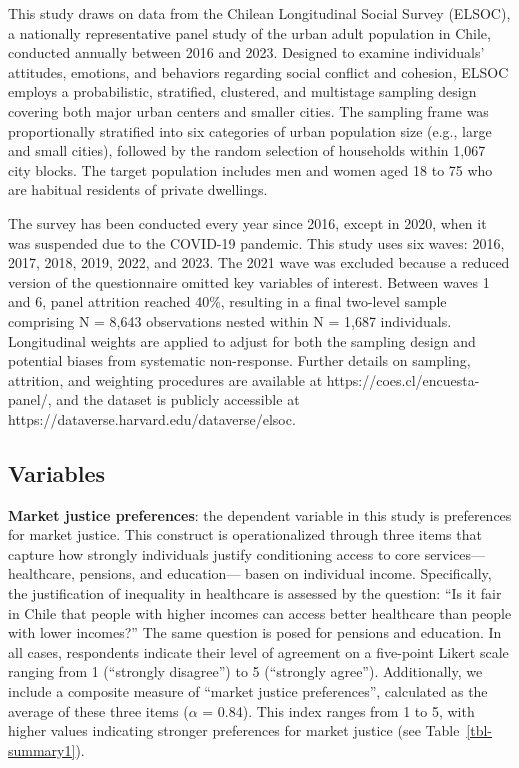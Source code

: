 \documentclass[
  12pt,
]{article}
\begin{document}
This study draws on data from the Chilean Longitudinal Social Survey
(ELSOC), a nationally representative panel study of the urban adult
population in Chile, conducted annually between 2016 and 2023. Designed
to examine individuals' attitudes, emotions, and behaviors regarding
social conflict and cohesion, ELSOC employs a probabilistic, stratified,
clustered, and multistage sampling design covering both major urban
centers and smaller cities. The sampling frame was proportionally
stratified into six categories of urban population size (e.g., large and
small cities), followed by the random selection of households within
1,067 city blocks. The target population includes men and women aged 18
to 75 who are habitual residents of private dwellings.

The survey has been conducted every year since 2016, except in 2020,
when it was suspended due to the COVID-19 pandemic. This study uses six
waves: 2016, 2017, 2018, 2019, 2022, and 2023. The 2021 wave was
excluded because a reduced version of the questionnaire omitted key
variables of interest. Between waves 1 and 6, panel attrition reached
40\%, resulting in a final two-level sample comprising N = 8,643
observations nested within N = 1,687 individuals. Longitudinal weights
are applied to adjust for both the sampling design and potential biases
from systematic non-response. Further details on sampling, attrition,
and weighting procedures are available at
https://coes.cl/encuesta-panel/, and the dataset is publicly accessible
at https://dataverse.harvard.edu/dataverse/elsoc.

\subsection{Variables}\label{variables}

\textbf{Market justice preferences}: the dependent variable in this
study is preferences for market justice. This construct is
operationalized through three items that capture how strongly
individuals justify conditioning access to core services---healthcare,
pensions, and education--- basen on individual income. Specifically, the
justification of inequality in healthcare is assessed by the question:
``Is it fair in Chile that people with higher incomes can access better
healthcare than people with lower incomes?'' The same question is posed
for pensions and education. In all cases, respondents indicate their
level of agreement on a five-point Likert scale ranging from 1
(``strongly disagree'') to 5 (``strongly agree''). Additionally, we
include a composite measure of ``market justice preferences'',
calculated as the average of these three items (\(\alpha\) = 0.84). This
index ranges from 1 to 5, with higher values indicating stronger
preferences for market justice (see Table~\ref{tbl-summary1}).
\end{document}
